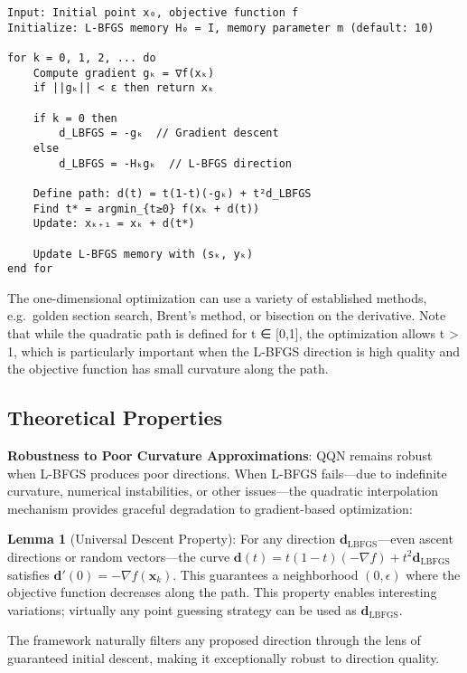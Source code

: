 \begin{verbatim}
Input: Initial point x₀, objective function f
Initialize: L-BFGS memory H₀ = I, memory parameter m (default: 10)

for k = 0, 1, 2, ... do
    Compute gradient gₖ = ∇f(xₖ)
    if ||gₖ|| < ε then return xₖ

    if k = 0 then
        d_LBFGS = -gₖ  // Gradient descent
    else
        d_LBFGS = -Hₖgₖ  // L-BFGS direction

    Define path: d(t) = t(1-t)(-gₖ) + t²d_LBFGS
    Find t* = argmin_{t≥0} f(xₖ + d(t))
    Update: xₖ₊₁ = xₖ + d(t*)

    Update L-BFGS memory with (sₖ, yₖ)
end for
\end{verbatim}

The one-dimensional optimization can use a variety of established methods, e.g.~golden section search, Brent's method, or bisection on the derivative.
Note that while the quadratic path is defined for t ∈ {[}0,1{]}, the optimization allows t \textgreater{} 1, which is particularly important when the L-BFGS direction is high quality and the objective function has small curvature along the path.

\hypertarget{theoretical-properties}{%
\subsection{Theoretical Properties}\label{theoretical-properties}}

\textbf{Robustness to Poor Curvature Approximations}: QQN remains robust when L-BFGS produces poor directions.
When L-BFGS fails---due to indefinite curvature, numerical instabilities, or other issues---the quadratic interpolation mechanism provides graceful degradation to gradient-based optimization:

\textbf{Lemma 1} (Universal Descent Property): For any direction \(\mathbf{d}_{\text{LBFGS}}\)---even ascent directions or random vectors---the curve \(\mathbf{d}(t) = t(1-t)(-\nabla f) + t^2 \mathbf{d}_{\text{LBFGS}}\) satisfies \(\mathbf{d}'(0) = -\nabla f(\mathbf{x}_k)\).
This guarantees a neighborhood \((0, \epsilon)\) where the objective function decreases along the path.
This property enables interesting variations; virtually any point guessing strategy can be used as \(\mathbf{d}_{\text{LBFGS}}\).

The framework naturally filters any proposed direction through the lens of guaranteed initial descent, making it exceptionally robust to direction quality.

